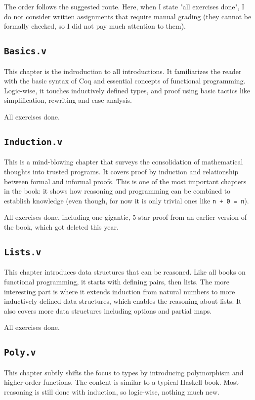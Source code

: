 \documentclass[screen,sigplan]{acmart}\settopmatter{printfolios=true,printccs=false,printacmref=false}
\begin{document}
The order follows the suggested route. Here, when I state "all exercises done", I do not consider written
assignments that require manual grading (they cannot be formally checked, so I did not pay much attention
to them).

\subsection{\texttt{Basics.v}}
This chapter is the indroduction to all introductions. It familiarizes the reader with the basic syntax of Coq
and essential concepts of functional programming.
Logic-wise, it touches inductively defined types, and proof using
basic tactics like simplification, rewriting and case analysis.

All exercises done.


\subsection{\texttt{Induction.v}}
This is a mind-blowing chapter that surveys the consolidation of mathematical thoughts into trusted programs.
It covers proof by induction and relationship between formal and informal proofs.
This is one of the most important chapters in the book: it shows how reasoning and programming can be
combined to establish knowledge (even though, for now it is only trivial ones like \texttt{n + 0 = n}).

All exercises done, including one gigantic, 5-star proof from an earlier version of the book, which
got deleted this year.


\subsection{\texttt{Lists.v}}
This chapter introduces data structures that can be reasoned. Like all books on functional programming,
it starts with defining pairs, then lists. The more interesting part is where it extends induction from
natural numbers to more inductively defined data structures, which enables the reasoning about lists. It
also covers more data structures including options and partial maps.

All exercises done.


\subsection{\texttt{Poly.v}}
This chapter subtly shifts the focus to types by introducing polymorphism and higher-order functions.
The content is similar to a typical Haskell book.
Most reasoning is still done with induction, so logic-wise, nothing much new.
\end{document}
